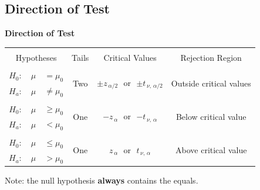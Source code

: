 \documentclass[compress]{beamer}        %
\makeatletter
\newcommand{\tcb}{\textcolor{beamer@blendedblue}}
\makeatother
\begin{document}
\subsection{Direction of Test}
\begin{frame}{\bf \tcb{Direction of Test}}

\begin{center}
\begin{tabular}{|c@{\,\,}c|c|c|c|}
\hline
&&&&\\[-0.2cm]
\multicolumn{2}{|c|}{Hypotheses}  & Tails & Critical Values & Rejection Region\\[0.2cm]
\hline
&&&&\\[-0.2cm]
$H_0: \quad \mu$ & $= \mu_0$   & \multirow{2}{*}{Two} & \multirow{2}{*}{$\pm z_{\,\alpha/2}$\,\, or \,\,$\pm t_{\,\nu,\,\alpha/2}$} & \multirow{2}{*}{Outside critical values}  \\[0.2cm]
$H_a: \quad \mu$ &  $\ne \mu_0$ &&& \\[0.3cm]
\hline
&&&&\\[-0.2cm]
$H_0: \quad \mu$ & $\ge \mu_0$  & \multirow{2}{*}{One} & \multirow{2}{*}{$- z_{\,\alpha}$\,\, or \,\,$- t_{\,\nu,\,\alpha}$} & \multirow{2}{*}{Below critical value}   \\[0.2cm]
$H_a: \quad \mu$ &  $< \mu_0$ &&&\\[0.3cm]
\hline
&&&&\\[-0.2cm]
$H_0: \quad \mu$ & $\le \mu_0$ & \multirow{2}{*}{One} & \multirow{2}{*}{$ z_{\,\alpha}$\,\, or \,\,$ t_{\,\nu,\,\alpha}$} & \multirow{2}{*}{Above  critical value}  \\[0.2cm]
$H_a: \quad \mu$ &  $> \mu_0$ &&& \\[0.3cm]
\hline
\end{tabular}
\end{center}

Note: the null hypothesis {\bf always} contains the equals.

\end{frame}
\end{document}
